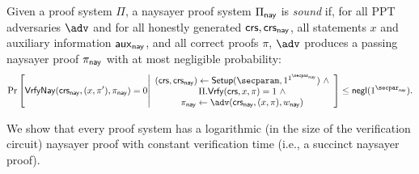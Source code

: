 \begin{definition} Given a proof system $\Pi$, a naysayer proof system $\Pi_{\mathsf{nay}}$ is \emph{sound} if, for all PPT adversaries $\adv$ and for all honestly generated $\mathsf{crs}, \mathsf{crs}_{\mathsf{nay}}$, all statements $x$ and auxiliary information $\mathsf{aux}_{\mathsf{nay}}$, and all correct proofs $\pi$, $\adv$ produces a passing naysayer proof $\pi_{\mathsf{nay}}$ with at most negligible probability:
\begin{equation*}
    \Pr\left[
        \vrfynay(\crs_{\nay}, (x,\pi'), \pi_{\nay})=0 
        \middle| 
        \begin{array}{c}
            (\crs, \crs_{\nay}) \gets \setup(\secparam, 1^{\naysecparam})~\land\\
            \Pi.\vrfy(\crs, x,\pi)=1~\land\\
            \pi_{\nay} \gets \adv(\crs_{\nay}, (x, \pi), \witness_{\nay})
        \end{array}
    \right] \leq\mathsf{negl}(\naysecparam).
\end{equation*}
\end{definition}

We show that every proof system has a logarithmic (in the size of the verification circuit) naysayer proof with constant verification time (i.e., a succinct naysayer proof). %


